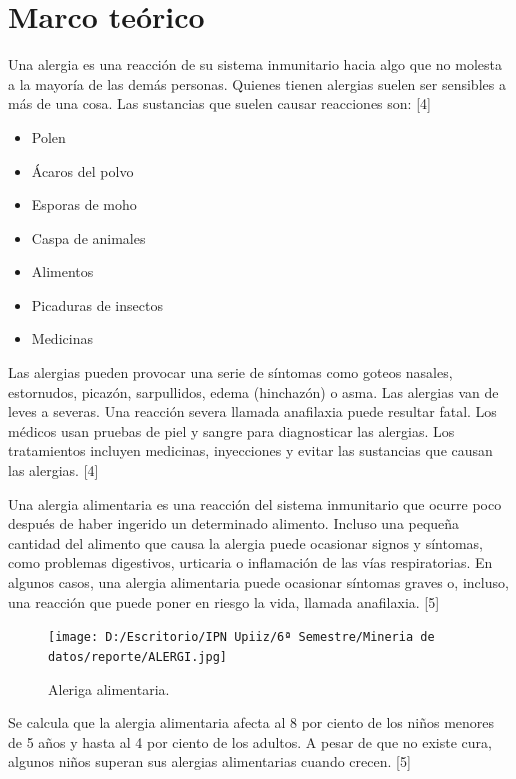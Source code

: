 \documentclass[
]{article}
\begin{document}
\hypertarget{marco-teuxf3rico}{%
\section{Marco teórico}\label{marco-teuxf3rico}}

Una alergia es una reacción de su sistema inmunitario hacia algo que no
molesta a la mayoría de las demás personas. Quienes tienen alergias
suelen ser sensibles a más de una cosa. Las sustancias que suelen causar
reacciones son: {[}4{]}

\begin{itemize}
\item
  Polen
\item
  Ácaros del polvo
\item
  Esporas de moho
\item
  Caspa de animales
\item
  Alimentos
\item
  Picaduras de insectos
\item
  Medicinas
\end{itemize}

Las alergias pueden provocar una serie de síntomas como goteos nasales,
estornudos, picazón, sarpullidos, edema (hinchazón) o asma. Las alergias
van de leves a severas. Una reacción severa llamada anafilaxia puede
resultar fatal. Los médicos usan pruebas de piel y sangre para
diagnosticar las alergias. Los tratamientos incluyen medicinas,
inyecciones y evitar las sustancias que causan las alergias. {[}4{]}

Una alergia alimentaria es una reacción del sistema inmunitario que
ocurre poco después de haber ingerido un determinado alimento. Incluso
una pequeña cantidad del alimento que causa la alergia puede ocasionar
signos y síntomas, como problemas digestivos, urticaria o inflamación de
las vías respiratorias. En algunos casos, una alergia alimentaria puede
ocasionar síntomas graves o, incluso, una reacción que puede poner en
riesgo la vida, llamada anafilaxia. {[}5{]}

\begin{figure}
\centering
\texttt{[image: D:/Escritorio/IPN Upiiz/6ª Semestre/Mineria de datos/reporte/ALERGI.jpg]}
\caption{Aleriga alimentaria.}
\end{figure}

Se calcula que la alergia alimentaria afecta al 8 por ciento de los
niños menores de 5 años y hasta al 4 por ciento de los adultos. A pesar
de que no existe cura, algunos niños superan sus alergias alimentarias
cuando crecen. {[}5{]}
\end{document}
